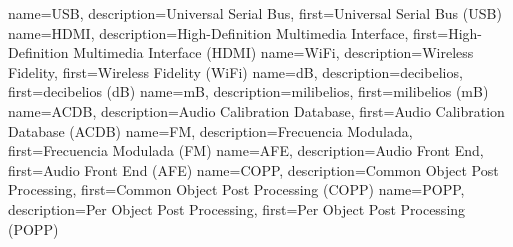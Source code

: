 {	
	name={USB},
	description={Universal Serial Bus},
	first={Universal Serial Bus (USB)}
}
{	
	name={HDMI},
	description={High-Definition Multimedia Interface},
	first={High-Definition Multimedia Interface (HDMI)}
}
{	
	name={WiFi},
	description={Wireless Fidelity},
	first={Wireless Fidelity (WiFi)}
}
{
	name={dB},
	description={decibelios},
	first={decibelios (dB)}
}
{
	name={mB},
	description={milibelios},
	first={milibelios (mB)}
}
{
	name={ACDB},
	description={Audio Calibration Database},
	first={Audio Calibration Database (ACDB)}
}
{
	name={FM},
	description={Frecuencia Modulada},
	first={Frecuencia Modulada (FM)}
}
{
	name={AFE},
	description={Audio Front End},
	first={Audio Front End (AFE)}
}
{
	name={COPP},
	description={Common Object Post Processing},
	first={Common Object Post Processing (COPP)}
}
{
	name={POPP},
	description={Per Object Post Processing},
	first={Per Object Post Processing (POPP)}
}